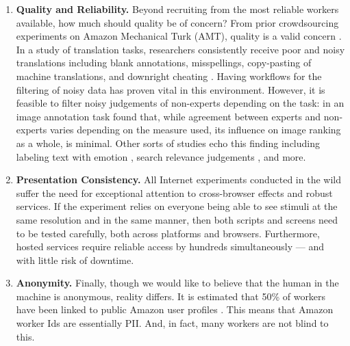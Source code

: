 \begin{enumerate}
\item \textbf{Quality and Reliability.} Beyond recruiting from the most reliable workers available, how much should quality be of concern? From prior crowdsourcing experiments on Amazon Mechanical Turk (AMT), quality is a valid concern \citep{CallisonBurch:2010vk,gormley-EtAl:2010:MTURK}. In a study of translation tasks, researchers consistently receive poor and noisy translations including blank annotations, misspellings, copy-pasting of machine translations, and downright cheating \citep{Ambati:2010ud}. Having workflows for the filtering of noisy data has proven vital in this environment. However, it is feasible to filter noisy judgements of non-experts depending on the task: in an image annotation task \cite{Nowak:2010gt} found that, while agreement between experts and non-experts varies depending on the measure used, its influence on image ranking as a whole, is minimal. Other sorts of studies echo this finding including labeling text with emotion \citep{Snow:2008wo}, search relevance judgements \citep{Alonso:2009vya}, and more.

\item \textbf{Presentation Consistency.} All Internet experiments conducted in the wild suffer the need for exceptional attention to cross-browser effects and robust services. If the experiment relies on everyone being able to see stimuli at the same resolution and in the same manner, then both scripts and screens need to be tested carefully, both across platforms and browsers. Furthermore, hosted services require reliable access by hundreds simultaneously --- and with little risk of downtime.

\item \textbf{Anonymity.} Finally, though we would like to believe that the human in the machine is anonymous, reality differs. It is estimated that 50\% of workers have been linked to public Amazon user profiles \citep{Lease:2013vq}. This means that Amazon worker Ids are essentially PII. And, in fact, many workers are not blind to this.
\end{enumerate}



